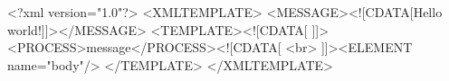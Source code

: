 <?xml version="1.0"?>
<XMLTEMPLATE>
    <MESSAGE><![CDATA[Hello world!]]></MESSAGE>
    <TEMPLATE><![CDATA[
            ]]><PROCESS>message</PROCESS><![CDATA[ <br>
        ]]><ELEMENT name="body"/>
    </TEMPLATE>
</XMLTEMPLATE>
